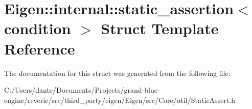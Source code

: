 \hypertarget{struct_eigen_1_1internal_1_1static__assertion}{}\section{Eigen\+::internal\+::static\+\_\+assertion$<$ condition $>$ Struct Template Reference}
\label{struct_eigen_1_1internal_1_1static__assertion}


The documentation for this struct was generated from the following file\+:\begin{DoxyCompactItemize}
\item 
C\+:/\+Users/dante/\+Documents/\+Projects/grand-\/blue-\/engine/reverie/src/third\+\_\+party/eigen/\+Eigen/src/\+Core/util/Static\+Assert.\+h\end{DoxyCompactItemize}
